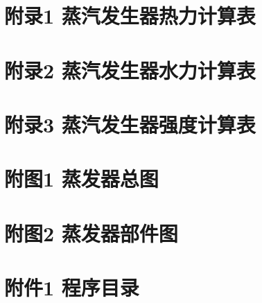 \setcounter{page}{1}
\begin{appendices}
	\newpage
	\section{附录1 蒸汽发生器热力计算表}
	

	\newpage
	\section{附录2 蒸汽发生器水力计算表}
	

	\newpage
	\section{附录3 蒸汽发生器强度计算表}
	

	\newpage
	\section{附图1 蒸发器总图}
	

	\newpage
	\section{附图2 蒸发器部件图}
	

	\newpage
	\section{附件1 程序目录}
	
\end{appendices}